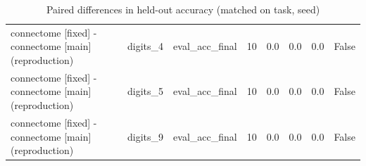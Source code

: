 \begin{table}[t]
\begin{tabular}{lllrrrrr}
connectome [fixed] - connectome [main] (reproduction) & digits\_4 & eval\_acc\_final & 10 & 0.0 & 0.0 & 0.0 & False \\
connectome [fixed] - connectome [main] (reproduction) & digits\_5 & eval\_acc\_final & 10 & 0.0 & 0.0 & 0.0 & False \\
connectome [fixed] - connectome [main] (reproduction) & digits\_9 & eval\_acc\_final & 10 & 0.0 & 0.0 & 0.0 & False \\
\bottomrule
\end{tabular}
\caption{Paired differences in held-out accuracy (matched on task, seed)}
\label{tab:capacity_paired}
\end{table}